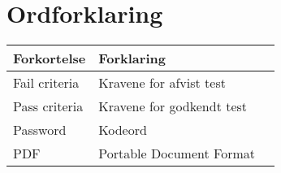 \chapter*{Ordforklaring}

\begin{tabularx}{\textwidth}{l l X} \hline
	\textbf{Forkortelse}  & \textbf{Forklaring} \\ \hline
	Fail criteria& Kravene for afvist test \\
	Pass criteria& Kravene for godkendt test \\
	Password& Kodeord& \\
	PDF& Portable Document Format \\	
	
\end{tabularx}